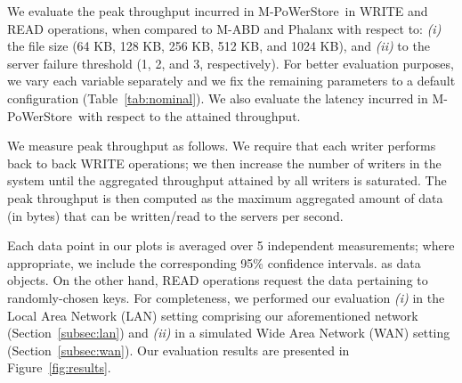 \documentclass[10pt,conference,compsocconf]{IEEEtran}
\newcommand{\mprotocol}{M-PoWerStore}
\begin{document}
We evaluate the peak throughput incurred in \mprotocol\ in \textsc{WRITE} and \textsc{READ} operations, when compared to M-ABD and Phalanx with respect to: \emph{(i)} the file size (64 KB, 128 KB, 256 KB, 512 KB, and 1024 KB), and \emph{(ii)}
to the server failure threshold  (1, 2, and 3, respectively). For better evaluation purposes, we vary each variable separately and we fix
the remaining parameters to a default configuration (Table~\ref{tab:nominal}).
We also evaluate the latency incurred in \mprotocol\ with respect to the attained throughput.










\begin{table}
\centering
{}
\caption{Default parameters used in evaluation.}
\vspace{-1 em}
\label{tab:nominal}
\end{table}

We measure peak throughput as follows. We require that each writer performs back to back \textsc{WRITE} operations; we then increase the number of writers in the system until
the aggregated throughput attained by all writers is saturated. The peak throughput is then computed as the maximum aggregated amount of data (in bytes) that can be written/read to the servers per second.

Each data point in our plots is averaged over 5 independent measurements; where appropriate, we include the corresponding 95\% confidence intervals. as data objects. On the other hand, \textsc{READ} operations request the data pertaining to randomly-chosen keys.
For completeness, we performed our evaluation \emph{(i)} in the Local Area Network (LAN) setting comprising our aforementioned network (Section~\ref{subsec:lan}) and \emph{(ii)} in a simulated Wide Area Network (WAN) setting (Section~\ref{subsec:wan}). Our evaluation results are presented in Figure~\ref{fig:results}.
\end{document}
